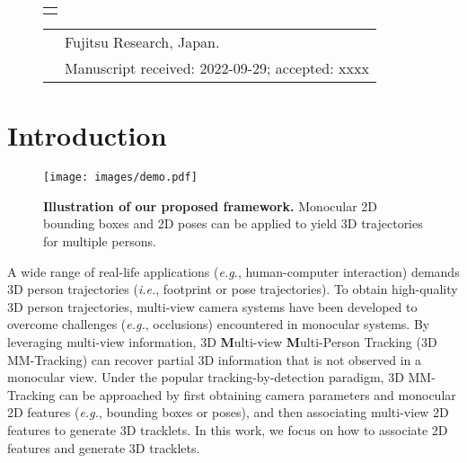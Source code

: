 \documentclass{CVM}
\newcommand{\ie}{{\it i.e.}}
\newcommand{\eg}{{\it e.g.}}
\begin{document}
\maketitle

    \begin{figure}[b] \vskip -4mm
    \small\renewcommand{}
        \begin{tabular}{p{80.5mm}} \toprule\\ \end{tabular}
        \vskip -4.5mm \noindent \setlength{\tabcolsep}{1pt}
        \begin{tabular}{p{3.5mm}p{80mm}}
     & Fujitsu Research, Japan.\\ 
&\hspace{-5mm} Manuscript received: 2022-09-29; accepted: xxxx \vspace{-2mm}
    \end{tabular} \vspace {-3mm}
    \end{figure}




\section{Introduction}
\begin{figure}[!h]
  \centering
  \texttt{[image: images/demo.pdf]}
  \captionsetup{font=small}
  \caption{\textbf{Illustration of our proposed framework.} Monocular 2D bounding boxes and 2D poses can be applied to yield 3D trajectories for multiple persons.}
  \label{fig:demo}
\end{figure}

A wide range of real-life applications (\eg, human-computer interaction) demands 3D person trajectories (\ie, footprint or pose trajectories). To obtain high-quality 3D person trajectories, multi-view camera systems have been developed to overcome challenges (\eg, occlusions) encountered in monocular systems. By leveraging multi-view information, 3D \textbf{M}ulti-view \textbf{M}ulti-Person Tracking (3D MM-Tracking) can recover partial 3D information that is not observed in a monocular view. Under the popular tracking-by-detection paradigm, 3D MM-Tracking can be approached by first obtaining camera parameters and monocular 2D features (\eg, bounding boxes or poses), and then associating multi-view 2D features to generate 3D tracklets. In this work, we focus on how to associate 2D features and generate 3D tracklets.
\end{document}
